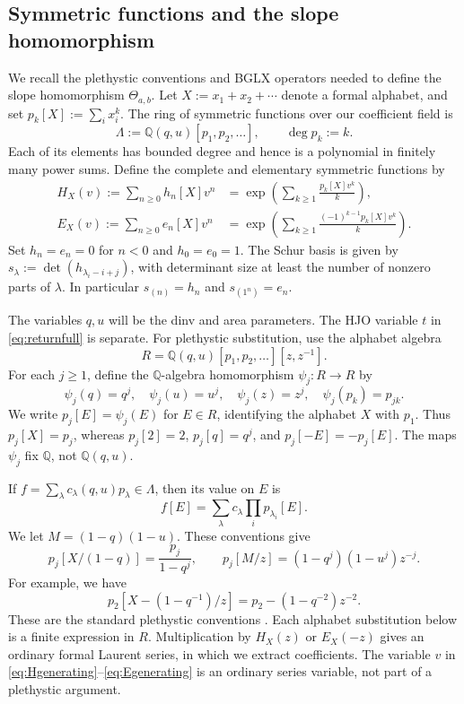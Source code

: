 \documentclass[12pt,reqno]{amsart}
\numberwithin{equation}{section}
\theoremstyle{definition}
\theoremstyle{remark}
\theoremstyle{plain}
\newcommand{\QQ}{\mathbb Q}
\begin{document}
\subsection{Symmetric functions and the slope homomorphism}
We recall the plethystic conventions and BGLX operators needed to define the slope homomorphism $\Theta_{a,b}$.
 Let $X:=x_1+x_2+\cdots$ denote a formal alphabet, and set $p_k[X]:=\sum_i x_i^k$. The ring of symmetric functions over our coefficient field is
\[
 \Lambda:=\QQ(q,u)[p_1,p_2,\ldots],\qquad \deg p_k:=k.
\]
Each of its elements has bounded degree and hence is a polynomial in finitely many power sums. Define the complete and elementary symmetric functions by
\begin{align}
 H_X(v):=\sum_{n\ge0}h_n[X]v^n
 &=\exp\left(\sum_{k\ge1}\frac{p_k[X]v^k}{k}\right),\label{eq:Hgenerating}\\
 E_X(v):=\sum_{n\ge0}e_n[X]v^n
 &=\exp\left(\sum_{k\ge1}\frac{(-1)^{k-1}p_k[X]v^k}{k}\right).
 \label{eq:Egenerating}
\end{align}
Set $h_n=e_n=0$ for $n<0$ and $h_0=e_0=1$. The Schur basis is given by $s_\lambda:=\det(h_{\lambda_i-i+j})$, with determinant size at least the number of nonzero parts of $\lambda$.
 In particular $s_{(n)}=h_n$ and $s_{(1^n)}=e_n$.

The variables $q,u$ will be the dinv and area parameters.
The HJO variable $t$ in \eqref{eq:returnfull} is separate.
For plethystic substitution, use the alphabet algebra
\[
 R=\QQ(q,u)[p_1,p_2,\ldots][z,z^{-1}].
\]
For each $j\ge1$, define the $\QQ$-algebra homomorphism
$\psi_j:R\to R$ by
\[
 \psi_j(q)=q^j,\quad \psi_j(u)=u^j,\quad
 \psi_j(z)=z^j,\quad \psi_j(p_k)=p_{jk}.
\]
We write $p_j[E]=\psi_j(E)$ for $E\in R$, identifying the alphabet
$X$ with $p_1$.  Thus $p_j[X]=p_j$, whereas $p_j[2]=2$,
$p_j[q]=q^j$, and $p_j[-E]=-p_j[E]$.  The maps $\psi_j$ fix $\QQ$, not $\QQ(q,u)$.

If $f=\sum_\lambda c_\lambda(q,u) p_\lambda\in\Lambda$, then its value on $E$ is
\[
 f[E]=\sum_\lambda c_\lambda\prod_i p_{\lambda_i}[E].
\]
We let $M=(1-q)(1-u).$
These conventions give
\[
 p_j[X/(1-q)]=\frac{p_j}{1-q^j},\qquad
 p_j[M/z]=(1-q^j)(1-u^j)z^{-j}.
\]
For example, we have
\[
 p_2[X-(1-q^{-1})/z]=p_2-(1-q^{-2})z^{-2}.
\]
These are the standard plethystic conventions
\cite[Chapter~1, Plethystic Notation]{Haglund}.
Each alphabet substitution below is a finite expression in $R$.
Multiplication by $H_X(z)$ or $E_X(-z)$ gives an ordinary formal
Laurent series, in which we extract coefficients.
The variable $v$ in \eqref{eq:Hgenerating}--\eqref{eq:Egenerating}
is an ordinary series variable, not part of a plethystic argument.
\end{document}
